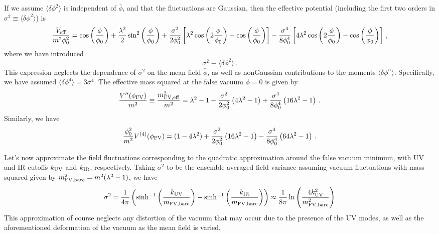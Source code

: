 \documentclass{revtex4}
\begin{document}
If we assume $\langle\delta\phi^2\rangle$ is independent of $\bar{\phi}$, and that the fluctuations are Gaussian, then the effective potential (including the first two orders in $\sigma^2\equiv\langle\delta\phi^2\rangle$) is
\begin{equation}
  \frac{V_{\rm eff}}{m^2\phi_0^2} = \cos\left(\frac{\phi}{\phi_0}\right) + \frac{\lambda^2}{2}\sin^2\left(\frac{\phi}{\phi_0}\right) + \frac{\sigma^2}{2\phi_0^2}\left[\lambda^2\cos\left(2\frac{\phi}{\phi_0}\right) - \cos\left(\frac{\phi}{\phi_0}\right)\right] - \frac{\sigma^4}{8\phi_0^4}\left[4\lambda^2\cos\left(2\frac{\phi}{\phi_0}\right) - \cos\left(\frac{\phi}{\phi_0}\right)\right] \, ,
\end{equation}
where we have introduced
\begin{equation}
  \sigma^2 \equiv \langle\delta\phi^2\rangle \, .
\end{equation}
This expression neglects the dependence of $\sigma^2$ on the mean field $\bar{\phi}$, as well as nonGaussian contributions to the moments $\langle\delta\phi^n\rangle$.  Specifically, we have assumed $\langle\delta\phi^4\rangle = 3\sigma^4$.
The effective mass squared at the false vacuum $\phi = 0$ is given by
\begin{equation}
  \frac{V''(\phi_{\rm FV})}{m^2} \equiv \frac{m^2_{\rm FV, eff}}{m^2} = \lambda^2-1 - \frac{\sigma^2}{2\phi_0^2}\left(4\lambda^2-1\right) + \frac{\sigma^4}{8\phi_0^4}\left(16\lambda^2-1\right) \, .
\end{equation}
Similarly, we have
\begin{equation}
  \frac{\phi_0^2}{m^2}V^{\rm (4)}(\phi_{\rm FV}) = (1-4\lambda^2) + \frac{\sigma^2}{2\phi_0^2}\left(16\lambda^2-1\right) - \frac{\sigma^4}{8\phi_0^4}\left(64\lambda^2-1\right) \, .
\end{equation}

Let's now approximate the field fluctuations corresponding to the quadratic approximation around the false vacuum minimum, with UV and IR cutoffs $k_{\rm UV}$ and $k_{\rm IR}$, respectively.
Taking $\sigma^2$ to be the ensemble averaged field variance assuming vacuum fluctuations with mass squared given by $m^2_{\rm FV, bare} = m^2(\lambda^2-1)$, we have
\begin{equation}
  \sigma^2 = \frac{1}{4\pi}\left(\sinh^{-1}\left(\frac{k_{\rm UV}}{m_{\rm FV, bare}}\right) - \sinh^{-1}\left(\frac{k_{\rm IR}}{m_{\rm FV, bare}}\right) \right) \approx \frac{1}{8\pi}\ln\left(\frac{4k_{\rm UV}^2}{m^2_{\rm FV, bare}}\right)
\end{equation}
This approximation of course neglects any distortion of the vacuum that may occur due to the presence of the UV modes, as well as the aforementioned deformation of the vacuum as the mean field is varied.
\end{document}
